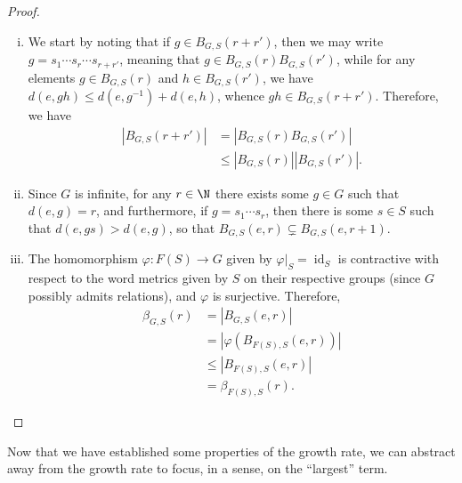 \documentclass[10pt]{mypackage}
\begin{document}
\begin{proof}\hfill
  \begin{enumerate}[(i)]
    \item We start by noting that if $g\in B_{G,S}\left( r+r' \right)$, then we may write $g = s_1\cdots s_r\cdots s_{r + r'}$, meaning that $g\in B_{G,S}(r)B_{G,S}\left(r'\right)$, while for any elements $g\in B_{G,S}(r)$ and $h\in B_{G,S}(r')$, we have $d\left( e,gh \right)\leq d\left( e,g^{-1} \right) + d\left( e,h \right)$, whence $gh\in B_{G,S}\left( r+r' \right)$. Therefore, we have
      \begin{align*}
        \left\vert B_{G,S}\left( r + r' \right) \right\vert &= \left\vert B_{G,S}\left( r \right)B_{G,S}\left( r' \right) \right\vert\\
                                                            &\leq \left\vert B_{G,S}\left( r \right) \right\vert \left\vert B_{G,S}\left( r' \right) \right\vert.
      \end{align*}
    \item Since $G$ is infinite, for any $r\in \N$ there exists some $g\in G$ such that $d\left( e,g \right) = r$, and furthermore, if $g = s_1\cdots s_r$, then there is some $s\in S$ such that $d\left( e,gs \right) > d\left( e,g \right)$, so that $B_{G,S}\left( e,r \right)\subsetneq B_{G,S}\left( e,r+1 \right)$.
    \item The homomorphism $\varphi\colon F(S)\rightarrow G$ given by $\varphi|_{S} = \operatorname{id}_S$ is contractive with respect to the word metrics given by $S$ on their respective groups (since $G$ possibly admits relations), and $\varphi$ is surjective. Therefore,
      \begin{align*}
        \beta_{G,S}\left( r \right) &= \left\vert B_{G,S}\left( e,r \right) \right\vert\\
                                    &= \left\vert \varphi\left( B_{F(S),S}\left( e,r \right) \right) \right\vert\\
                                    &\leq \left\vert B_{F(S),S}\left( e,r \right) \right\vert\\
                                    &= \beta_{F(S),S}(r).
      \end{align*}
  \end{enumerate}
\end{proof}
Now that we have established some properties of the growth rate, we can abstract away from the growth rate to focus, in a sense, on the ``largest'' term.
\end{document}
